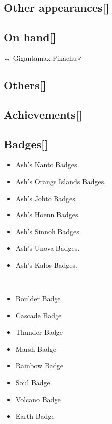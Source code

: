 \documentclass[a4paper,12pt]{article}
\begin{document}
\subsection*{Other appearances[]}\n\n\subsection*{On hand[]}\n\nPikachu ↔ Gigantamax Pikachu♂\\ \par \vspace{0.5cm}

\subsection*{Others[]}\n\n\subsection*{Achievements[]}\n\n\subsection*{Badges[]}\n\n\begin{itemize}
\item Ash's Kanto Badges.
\item Ash's Orange Islands Badges.
\item Ash's Johto Badges.
\item Ash's Hoenn Badges.
\item Ash's Sinnoh Badges.
\item Ash's Unova Badges.
\item Ash's Kalos Badges.
\end{itemize}\\ \par \vspace{0.5cm}

\begin{itemize}
\item Boulder Badge
\item Cascade Badge
\item Thunder Badge
\item Marsh Badge
\item Rainbow Badge
\item Soul Badge
\item Volcano Badge
\item Earth Badge
\end{itemize}\\ \par \vspace{0.5cm}
\end{document}

